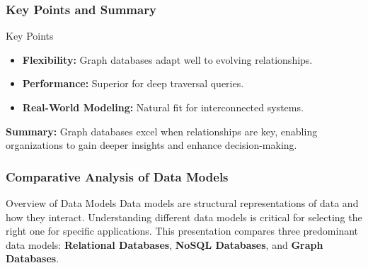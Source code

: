 \documentclass[aspectratio=169]{beamer}
\begin{document}
\begin{frame}[fragile]
    \frametitle{Key Points and Summary}
    \begin{block}{Key Points}
        \begin{itemize}
            \item \textbf{Flexibility:} Graph databases adapt well to evolving relationships.
            \item \textbf{Performance:} Superior for deep traversal queries.
            \item \textbf{Real-World Modeling:} Natural fit for interconnected systems.
        \end{itemize}
    \end{block}
    
    \textbf{Summary:} Graph databases excel when relationships are key, enabling organizations to gain deeper insights and enhance decision-making.
\end{frame}

\begin{frame}[fragile]
    \frametitle{Comparative Analysis of Data Models}
    \begin{block}{Overview of Data Models}
        Data models are structural representations of data and how they interact. 
        Understanding different data models is critical for selecting the right one for specific applications. This presentation compares three predominant data models: 
        \textbf{Relational Databases}, \textbf{NoSQL Databases}, and \textbf{Graph Databases}.
    \end{block}
\end{frame}
\end{document}
